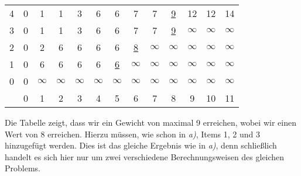 \documentclass[12pt,a4paper]{article}
\begin{document}
\begin{enumerate}[a)]
 		\begin{table}[hbt]
  		\begin{tabular}{l|cccccccccccc}
  	 	 	4 & 0 & 1 & 1 & 3 & 6 & 6 & 7 & 7 & \underline{9} & 12 & 12 & 14\\
	    	3 & 0 & 1 & 1 & 3 & 6 & 6 & 7 & 7 & \underline{9} & $\infty$ & $\infty$ & $\infty$\\
	    	2 & 0 & 2 & 6 & 6 & 6 & 6 & \underline{8} & $\infty$ & \underline{$\infty$} & $\infty$ & $\infty$ & $\infty$\\
	    	1 & 0 & 6 & 6 & 6 & 6 & \underline{6} & \underline{$\infty$} & $\infty$ & $\infty$ & $\infty$ & $\infty$ & $\infty$\\
	    	0 & 0 & $\infty$ & $\infty$ & $\infty$ & $\infty$ & \underline{$\infty$} & $\infty$ & $\infty$ & $\infty$ & $\infty$ & $\infty$ & $\infty$\\
	    	\hline
	    	  & 0 & 1 & 2 & 3 & 4 & 5 & 6 & 7 & 8 & 9 & 10 & 11\\
  		\end{tabular}
		\end{table}
 	 
 		Die Tabelle zeigt, dass wir ein Gewicht von maximal 9 erreichen, wobei wir einen Wert von 8 erreichen. Hierzu müssen, wie schon in \textit{a)}, Items 1, 2 und 3 hinzugefügt werden. Dies ist das gleiche Ergebnis wie in \textit{a)}, denn schließlich handelt es sich hier nur um zwei verschiedene Berechnungsweisen des gleichen Problems.
 	
\end{enumerate}
\end{document}
